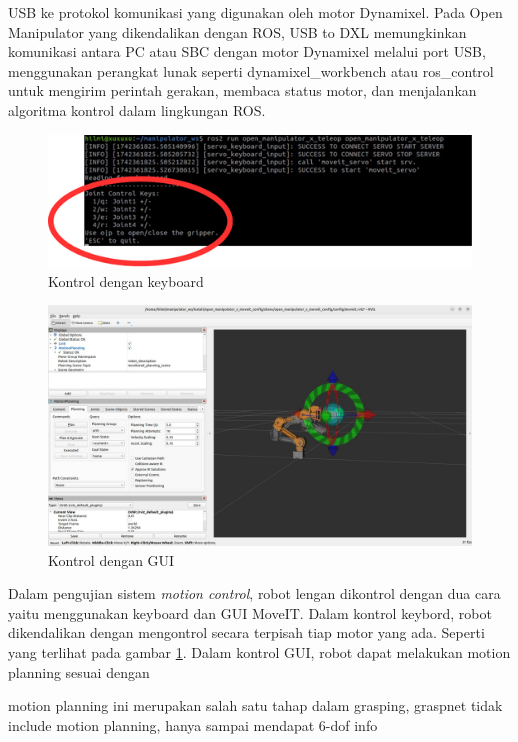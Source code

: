 USB ke protokol komunikasi yang digunakan oleh motor Dynamixel. Pada Open Manipulator yang dikendalikan dengan ROS,
USB to DXL memungkinkan komunikasi antara PC atau SBC dengan motor Dynamixel melalui port USB, menggunakan perangkat lunak
seperti dynamixel\_workbench atau ros\_control untuk mengirim perintah gerakan,
membaca status motor, dan menjalankan algoritma kontrol dalam lingkungan ROS.
\begin{figure} [H] \centering
    \includegraphics[scale=0.8]{gambar/keyboard control anotated.png}
    \caption{Kontrol dengan keyboard}
    \label{fig:keyboard_control}
  \end{figure}
\begin{figure} [H] \centering
    \includegraphics[scale=0.3]{gambar/moveit gui.jpeg}
    \caption{Kontrol dengan GUI}
    \label{fig:moveit_gui}
\end{figure}
Dalam pengujian sistem \emph{motion control}, robot lengan dikontrol dengan dua cara yaitu menggunakan keyboard dan GUI MoveIT.
Dalam kontrol keybord, robot dikendalikan dengan mengontrol secara terpisah tiap motor yang ada.
Seperti yang terlihat pada gambar \ref{fig:keyboard_control}.
Dalam kontrol GUI, robot dapat melakukan motion planning sesuai dengan 

motion planning ini merupakan salah satu tahap dalam grasping,
graspnet tidak include motion planning, hanya sampai mendapat 6-dof info